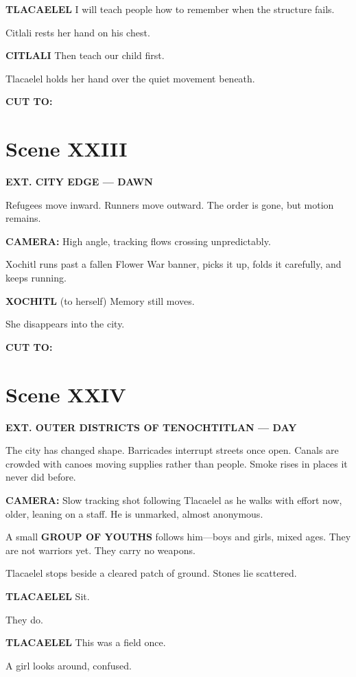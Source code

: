 \documentclass[12pt]{article}
\begin{document}
\textbf{TLACAELEL}  
I will teach people how to remember  
when the structure fails.

Citlali rests her hand on his chest.

\textbf{CITLALI}  
Then teach our child first.

Tlacaelel holds her hand over the quiet movement beneath.

\textbf{CUT TO:}

\section*{Scene XXIII}

\textbf{EXT. CITY EDGE — DAWN}

Refugees move inward. Runners move outward. The order is gone, but motion remains.

\textbf{CAMERA:} High angle, tracking flows crossing unpredictably.

Xochitl runs past a fallen Flower War banner, picks it up, folds it carefully, and keeps running.

\textbf{XOCHITL}  
(to herself)  
Memory still moves.

She disappears into the city.

\textbf{CUT TO:}

\section*{Scene XXIV}

\textbf{EXT. OUTER DISTRICTS OF TENOCHTITLAN — DAY}

The city has changed shape. Barricades interrupt streets once open. Canals are crowded with canoes moving supplies rather than people. Smoke rises in places it never did before.

\textbf{CAMERA:} Slow tracking shot following Tlacaelel as he walks with effort now, older, leaning on a staff. He is unmarked, almost anonymous.

A small \textbf{GROUP OF YOUTHS} follows him—boys and girls, mixed ages. They are not warriors yet. They carry no weapons.

Tlacaelel stops beside a cleared patch of ground. Stones lie scattered.

\textbf{TLACAELEL}  
Sit.

They do.

\textbf{TLACAELEL}  
This was a field once.

A girl looks around, confused.
\end{document}
